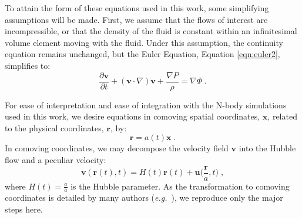 \documentclass[twocolumn,superscriptaddress,prd]{revtex4}
\newcommand{\eg}{\textit{e.g.}~}
\begin{document}
To attain the form of these equations used in this work, some
simplifying assumptions will be made.  
First, we assume that
the flows of interest are incompressible, or that the density of
the fluid is constant within an infinitesimal
volume element moving with the fluid.  
Under this assumption, the continuity equation remains unchanged, but
the Euler Equation, Equation \eqref{eqn:euler2}, simplifies to:
\begin{equation}\label{eqn:euler3}
  \frac{ \partial \mathbf{v} }{\partial t} + ( \mathbf{v} \cdot \nabla )
  \mathbf{v} + \frac{ \nabla P }{\rho} = \nabla \Phi \;.
\end{equation} 

For ease of interpretation and ease of integration with the N-body simulations
used in this work, we desire equations in comoving spatial
coordinates, $\mathbf{x}$, related to the physical coordinates, $\mathbf{r}$, by:
\begin{equation}\label{eqn:comovingx}
  \mathbf{r} = a(t) \mathbf{x} \;.
\end{equation}
In comoving coordinates, we may decompose the velocity field $\mathbf{v}$ 
into the 
Hubble flow and a peculiar velocity: %
\begin{equation}\label{eqn:comovingv}
  \mathbf{v}(\mathbf{r}(t),t)=H(t)\mathbf{r}(t) +
  \mathbf{u}\bigg(\frac{\mathbf{r}}{a},t\bigg) \;,
\end{equation}
where $H(t) = \frac{\dot{a}}{{a}}$ is the Hubble parameter.
As the transformation to comoving coordinates is detailed by many
authors (\eg \cite{peebles,schneider,baumann}), we
reproduce only the major steps here.
\end{document}
